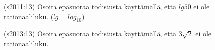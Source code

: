 \begin{tehtava}
(s2011:13) Osoita epäsuoraa todistusta käyttämällä, että $lg50$ ei ole rationaaliluku. ($lg=log_{10}$) 
\begin{vastaus}
\end{vastaus}
\end{tehtava}



\begin{tehtava}
(s2013:13) Osoita epäsuoraa todistusta käyttämällä, että $3\sqrt{2}$ ei ole rationaaliluku. 
\begin{vastaus}
\end{vastaus}
\end{tehtava}






